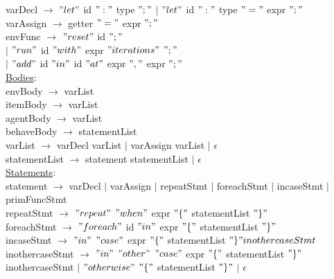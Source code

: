 \documentclass{article}
\begin{document}
varDecl $\rightarrow$ $"let"$ id $":"$ type $";"$ $\vert$ $"let"$ id $":"$ type $"="$ expr $";"$ \\

varAssign $\rightarrow$ getter $"="$ expr $";"$ \\

envFunc $\rightarrow$ $"reset"$ id $";"$ \\
$\vert$ $"run"$ id $"with"$ expr $"iterations"$ $";"$\\
$\vert$ $"add"$ id $"in"$ id $"at"$ expr $","$ expr  $";"$\\

\underline{Bodies}: \\

envBody $\rightarrow$ varList \\

itemBody $\rightarrow$ varList \\

agentBody $\rightarrow$ varList \\

behaveBody $\rightarrow$ statementList \\

varList $\rightarrow$ varDecl varList $\vert$ varAssign varList $\vert$ $\epsilon$ \\

statementList $\rightarrow$ statement statementList $\vert$ $\epsilon$ \\

\underline{Statements}: \\

statement $\rightarrow$ varDecl $\vert$ varAssign $\vert$ repeatStmt $\vert$ foreachStmt $\vert$ incaseStmt $\vert$ primFuncStmt \\

repeatStmt $\rightarrow$ $"repeat"$ $"when"$ expr $"\{"$ statementList  $"\}"$ \\

foreachStmt $\rightarrow$ $"foreach"$ id $"in"$ expr $"\{"$ statementList  $"\}"$ \\

incaseStmt $\rightarrow$  $"in"$  $"case"$ expr $"\{"$ statementList  $"\}" inothercaseStmt$\\

inothercaseStmt $\rightarrow$  $"in"$ $"other"$  $"case"$ expr $"\{"$ statementList  $"\}"$ inothercaseStmt $\vert$ $"otherwise"$ $"\{"$ statementList  $"\}"$ $\vert$ $\epsilon$ \\  
\end{document}
